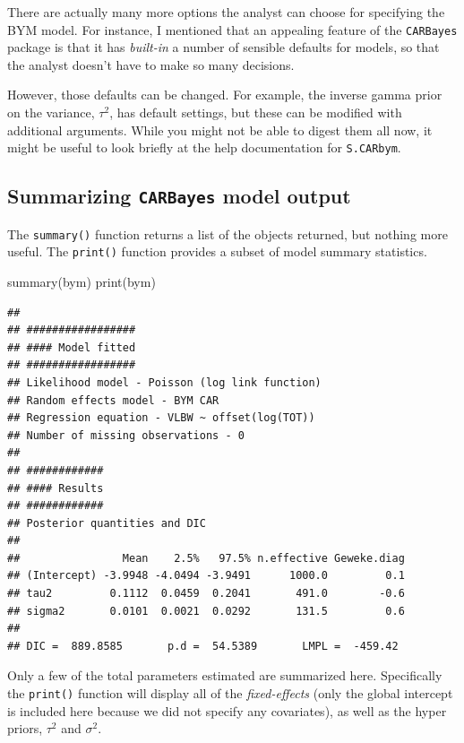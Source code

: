\documentclass[
]{book}
\newenvironment{Shaded}{\begin{snugshade}}{\end{snugshade}}
\newcommand{\FunctionTok}[1]{\textcolor[rgb]{0.00,0.00,0.00}{#1}}
\newcommand{\NormalTok}[1]{#1}
\begin{document}
There are actually many more options the analyst can choose for specifying the BYM model. For instance, I mentioned that an appealing feature of the \texttt{CARBayes} package is that it has \emph{built-in} a number of sensible defaults for models, so that the analyst doesn't have to make so many decisions.

However, those defaults can be changed. For example, the inverse gamma prior on the variance, \(\tau^2\), has default settings, but these can be modified with additional arguments. While you might not be able to digest them all now, it might be useful to look briefly at the help documentation for \texttt{S.CARbym}.

\hypertarget{summarizing-carbayes-model-output}{%
\subsection{\texorpdfstring{Summarizing \texttt{CARBayes} model output}{Summarizing CARBayes model output}}\label{summarizing-carbayes-model-output}}

The \texttt{summary()} function returns a list of the objects returned, but nothing more useful. The \texttt{print()} function provides a subset of model summary statistics.

\begin{Shaded}
\begin{Highlighting}[]
\FunctionTok{summary}\NormalTok{(bym)}
\FunctionTok{print}\NormalTok{(bym)}
\end{Highlighting}
\end{Shaded}

\begin{verbatim}
## 
## #################
## #### Model fitted
## #################
## Likelihood model - Poisson (log link function) 
## Random effects model - BYM CAR
## Regression equation - VLBW ~ offset(log(TOT))
## Number of missing observations - 0
## 
## ############
## #### Results
## ############
## Posterior quantities and DIC
## 
##                Mean    2.5%   97.5% n.effective Geweke.diag
## (Intercept) -3.9948 -4.0494 -3.9491      1000.0         0.1
## tau2         0.1112  0.0459  0.2041       491.0        -0.6
## sigma2       0.0101  0.0021  0.0292       131.5         0.6
## 
## DIC =  889.8585       p.d =  54.5389       LMPL =  -459.42
\end{verbatim}

Only a few of the total parameters estimated are summarized here. Specifically the \texttt{print()} function will display all of the \emph{fixed-effects} (only the global intercept is included here because we did not specify any covariates), as well as the hyper priors, \(\tau^2\) and \(\sigma^2\).
\end{document}
